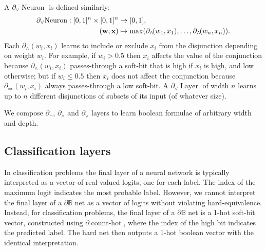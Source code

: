 \documentclass{article} %
\begin{document}
A $\partial_{\vee}\!\operatorname{Neuron}$ is defined similarly:
\begin{equation*}
\begin{aligned}
\partial_{\vee}\!\operatorname{Neuron}: [0,1]^{n} \times [0,1]^{n} &\to [0,1], \\
({\bf w}, {\bf x}) &\mapsto \max(\partial_{\wedge}\!(w_{1}, x_{1}), \dots, \partial_{\wedge}\!(w_{n}, x_{n}))\text{.}
\end{aligned}
\end{equation*}
Each $\partial_{\wedge}(w_{i},x_{i})$ learns to include or exclude $x_{i}$ from the disjunction depending on weight $w_{i}$. For example, if $w_{i}>0.5$ then $x_{i}$ affects the value of the conjunction because $\partial_{\wedge}(w_{i},x_{i})$ passes-through a soft-bit that is high if $x_{i}$ is high, and low otherwise; but if $w_{i} \leq 0.5$ then $x_{i}$ does not affect the conjunction because $\partial_{\Rightarrow}(w_{i},x_{i})$ always passes-through a low soft-bit. A $\partial_{\vee}\!\operatorname{Layer}$ of width $n$ learns up to $n$ different disjunctions of subsets of its input (of whatever size).

We compose $\partial_{\neg}$, $\partial_{\wedge}$ and $\partial_{\vee}$ layers to learn boolean formulae of arbitrary width and depth.

\subsection{Classification layers}

In classification problems the final layer of a neural network is typically interpreted as a vector of real-valued logits, one for each label. The index of the maximum logit indicates the most probable label. However, we cannot interpret the final layer of a $\partial\mathbb{B}$ net as a vector of logits without violating hard-equivalence. Instead, for classification problems, the final layer of a $\partial\mathbb{B}$ net is a 1-hot soft-bit vector, constructed using $\partial\!\operatorname{count-hot}$, where the index of the high bit indicates the predicted label. The hard net then outputs a 1-hot boolean vector with the identical interpretation.
\end{document}
